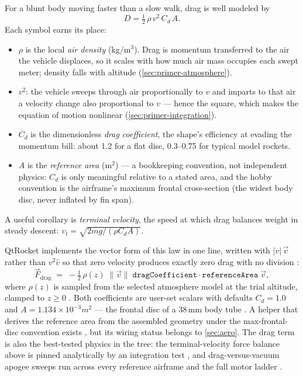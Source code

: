 \begin{physbox}
For a blunt body moving faster than a slow walk, drag is well modeled by
\begin{equation}
  D = \tfrac{1}{2}\,\rho\,v^{2}\,C_d\,A .
\end{equation}
Each symbol earns its place:
\begin{itemize}
\item $\rho$ is the local \emph{air density} (kg/m$^3$). Drag is momentum transferred to
  the air the vehicle displaces, so it scales with how much air mass occupies each swept
  meter; density falls with altitude (\cref{sec:primer-atmosphere}).
\item $v^{2}$: the vehicle sweeps through air proportionally to $v$ and imparts to that air
  a velocity change also proportional to $v$ --- hence the square, which makes the equation
  of motion nonlinear (\cref{sec:primer-integration}).
\item $C_d$ is the dimensionless \emph{drag coefficient}, the shape's efficiency at evading
  the momentum bill: about 1.2 for a flat disc, 0.3--0.75 for typical model rockets.
\item $A$ is the \emph{reference area} (m$^2$) --- a bookkeeping convention, not
  independent physics: $C_d$ is only meaningful relative to a stated area, and the hobby
  convention is the airframe's maximum frontal cross-section (the widest body disc, never
  inflated by fin span).
\end{itemize}
A useful corollary is \emph{terminal velocity}, the speed at which drag balances weight in
steady descent: $v_t = \sqrt{2mg/(\rho C_d A)}$.
\end{physbox}

QtRocket implements the vector form of this law in one line, written with $|v|\,\vec v$
rather than $v^2\hat v$ so that zero velocity produces exactly zero drag with no division
:
\begin{equation}
  \vec F_{\text{drag}} \;=\; -\tfrac{1}{2}\,\rho(z)\;\lVert\vec v\rVert\;
  \mathtt{dragCoefficient}\cdot\mathtt{referenceArea}\;\vec v ,
\end{equation}
where $\rho(z)$ is sampled from the selected atmosphere model at the trial altitude, clamped
to $z \ge 0$ . Both coefficients are user-set scalars with
defaults $C_d = 1.0$  and $A = 1.134\times10^{-3}\unit{m^2}$
--- the frontal disc of a 38\,mm body tube . A helper that
derives the reference area from the assembled geometry under the max-frontal-disc convention
exists , but its wiring status belongs to \cref{sec:aero}.
The drag term is also the best-tested physics in the tree: the terminal-velocity force
balance above is pinned analytically by an integration test
, and drag-versus-vacuum apogee sweeps run across
every reference airframe and the full motor ladder .

